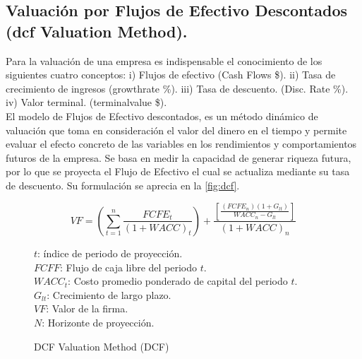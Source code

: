 \begin{rightcolumn}

\subsection{Valuaci\'on por Flujos de Efectivo Descontados (\gls{dcf} Valuation Method).}

Para la valuaci\'on de una empresa es indispensable el conocimiento de los siguientes cuatro conceptos: i) Flujos de efectivo (Cash Flows \$). ii) Tasa de crecimiento de ingresos (\gls{growthrate} \%). iii) Tasa de descuento. (Disc. Rate \%). iv) Valor terminal. (\gls{terminalvalue} \$).\\

El modelo de Flujos de Efectivo descontados, es un m\'etodo din\'amico de valuaci\'on que toma en consideraci\'on el valor del dinero en el tiempo y permite evaluar el efecto concreto de las variables en los rendimientos y comportamientos futuros de la empresa. Se basa en medir la capacidad de generar riqueza futura, por lo que se proyecta el Flujo de Efectivo el cual se actualiza mediante su tasa de descuento. Su formulaci\'on se aprecia en la \textcolor{secundario}{\autoref{fig:dcf}}.\\

\end{rightcolumn}

\begin{leftcolumn}

\begin{figure}[H]
\centering
\caption{\textcolor{principal}{DCF Valuation Method (DCF)\label{fig:dcf}}}
$$VF=\left(\sum_{t=1}^n\frac{FCFE_t}{(1+WACC)_t}\right) + \frac{\left[\frac{(FCFE_n)(1+G_{lt})}{WACC_n-G_{lt}}\right]}{(1+WACC)_n}$$

\begin{minipage}{7cm}
\footnotesize
$t$: \'indice de periodo de proyecci\'on.\\
$FCFF$: Flujo de caja libre del periodo $t$.\\
$WACC_t$: Costo promedio ponderado de capital del periodo $t$.\\
$G_{lt}$: Crecimiento de largo plazo.\\
$VF$: Valor de la firma.\\
$N$: Horizonte de proyecci\'on.\\

\end{minipage}
\end{figure}

\end{leftcolumn}